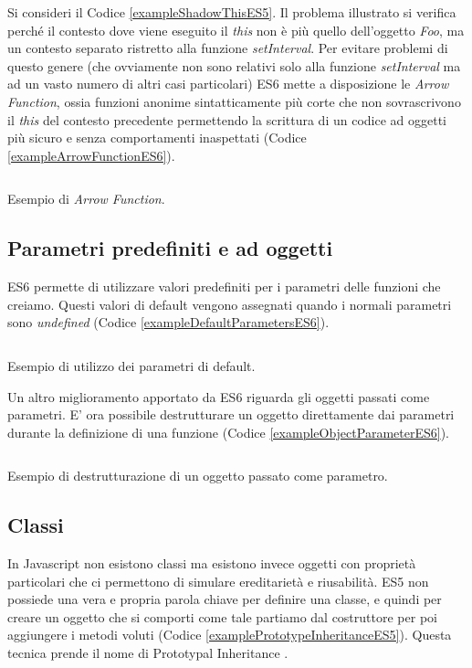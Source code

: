 Si consideri il Codice \ref{exampleShadowThisES5}. Il problema illustrato si verifica perché il contesto dove viene eseguito il \textit{this} non è più quello dell'oggetto \textit{Foo}, ma un contesto separato ristretto alla funzione \textit{setInterval}. Per evitare problemi di questo genere (che ovviamente non sono relativi solo alla funzione \textit{setInterval} ma ad un vasto numero di altri casi particolari) ES6 mette a disposizione le \textit{Arrow Function}, ossia funzioni anonime sintatticamente più corte che non sovrascrivono il \textit{this} del contesto precedente permettendo la scrittura di un codice ad oggetti più sicuro e senza comportamenti inaspettati (Codice \ref{exampleArrowFunctionES6}).

\begin{listing}[ht]
\inputminted{Javascript}{sources/exampleArrowFunctionES6.js}
\caption{Esempio di \textit{Arrow Function}.}
\label{exampleArrowFunctionES6}
\end{listing} 

\subsection{Parametri predefiniti e ad oggetti}
ES6 permette di utilizzare valori predefiniti per i parametri delle funzioni che creiamo. Questi valori di default vengono assegnati quando i normali parametri sono \textit{undefined} (Codice \ref{exampleDefaultParametersES6}). 

\begin{listing}[ht]
\inputminted{Javascript}{sources/exampleDefaultParametersES6.js}
\caption{Esempio di utilizzo dei parametri di default.}
\label{exampleDefaultParametersES6}
\end{listing}

Un altro miglioramento apportato da ES6 riguarda gli oggetti passati come parametri. E' ora possibile destrutturare un oggetto direttamente dai parametri durante la definizione di una funzione (Codice \ref{exampleObjectParameterES6}).

\begin{listing}[ht]
\inputminted{Javascript}{sources/exampleObjectParameterES6.js}
\caption{Esempio di destrutturazione di un oggetto passato come parametro.}
\label{exampleObjectParameterES6}
\end{listing}

\subsection{Classi}
In Javascript non esistono classi ma esistono invece oggetti con proprietà particolari che ci permettono di simulare ereditarietà e riusabilità. ES5 non possiede una vera e propria parola chiave per definire una classe, e quindi per creare un oggetto che si comporti come tale partiamo dal costruttore per poi aggiungere i metodi voluti (Codice \ref{examplePrototypeInheritanceES5}). Questa tecnica prende il nome di Prototypal Inheritance \cite{RylanOnPrototypeInheritance}.

